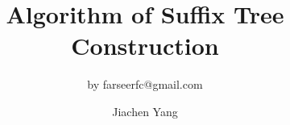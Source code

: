 
\usepackage{tikz} 
\usepackage{mathptmx}
\usepackage[latin1]{inputenc}
\usepackage{color}
\usepackage{amsmath}
\usepackage{amssymb}



\def\beamer@linkspace#1{%
  \begin{pgfpicture}{0pt}{-1.5pt}{#1}{5.5pt}
    \pgfsetfillopacity{0}
    \pgftext[x=0pt,y=-1.5pt]{.}
    \pgftext[x=#1,y=5.5pt]{.}
  \end{pgfpicture}}


\usepackage[english]{babel}


\graphicspath{{figure/}}



\newcommand{\br}[0]{\par\vskip15pt\par}




\title[SuffixTree]{Algorithm of Suffix Tree Construction}

\subtitle{by farseerfc@gmail.com}

\author[jc-yang]{
	Jiachen Yang 
}




\frame{\maketitle}





